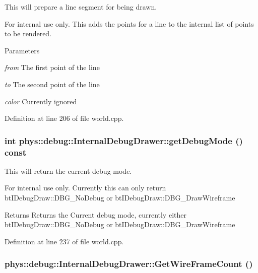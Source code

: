 This will prepare a line segment for being drawn. 

\begin{DoxyInternal}{For internal use only.}
This adds the points for a line to the internal list of points to be rendered. 
\begin{DoxyParams}{Parameters}
\item[{\em from}]The first point of the line \item[{\em to}]The second point of the line \item[{\em color}]Currently ignored \end{DoxyParams}
\end{DoxyInternal}


Definition at line 206 of file world.cpp.

\hypertarget{classphys_1_1debug_1_1InternalDebugDrawer_aba329861569d741e970ce5aafb668e84}{
\subsubsection[{getDebugMode}]{\setlength{\rightskip}{0pt plus 5cm}int phys::debug::InternalDebugDrawer::getDebugMode () const}}
\label{db/d27/classphys_1_1debug_1_1InternalDebugDrawer_aba329861569d741e970ce5aafb668e84}


This will return the current debug mode. 

\begin{DoxyInternal}{For internal use only.}
Currently this can only return btIDebugDraw::DBG\_\-NoDebug or btIDebugDraw::DBG\_\-DrawWireframe \begin{DoxyReturn}{Returns}
Returns the Current debug mode, currently either btIDebugDraw::DBG\_\-NoDebug or btIDebugDraw::DBG\_\-DrawWireframe 
\end{DoxyReturn}
\end{DoxyInternal}


Definition at line 237 of file world.cpp.

\hypertarget{classphys_1_1debug_1_1InternalDebugDrawer_aa1666e636e6ff81813c0b1a85d7bc157}{
\subsubsection[{GetWireFrameCount}]{ phys::debug::InternalDebugDrawer::GetWireFrameCount ()}}
\label{db/d27/classphys_1_1debug_1_1InternalDebugDrawer_aa1666e636e6ff81813c0b1a85d7bc157}


